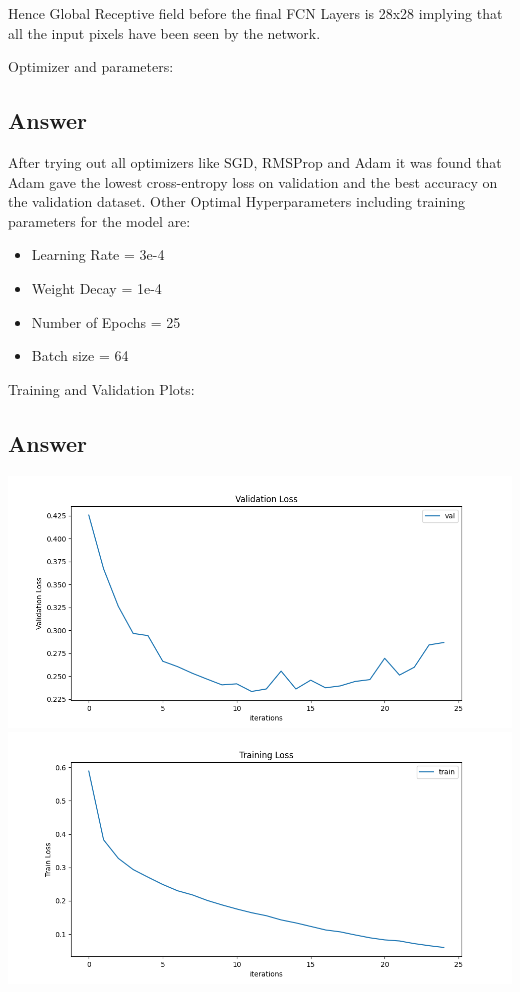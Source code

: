 \documentclass[
	12pt, %
]{fphw}
\begin{document}
Hence Global Receptive field before the final FCN Layers is 28x28 implying that all the input pixels have been seen by the network.

\begin{problem}
	Optimizer and parameters:
\end{problem}

\subsection*{Answer}

After trying out all optimizers like SGD, RMSProp and Adam it was found that Adam gave the lowest cross-entropy loss on validation and the best accuracy on the validation dataset.
Other Optimal Hyperparameters including training parameters for the model are:

\begin{itemize}
	\item Learning Rate =  3e-4  
	\item Weight Decay = 1e-4
	\item Number of Epochs = 25 
	\item Batch size = 64 
\end{itemize} 

\begin{problem}
	Training and Validation Plots:
\end{problem}

\subsection*{Answer}

\begin{center}
	\includegraphics[width=0.85\columnwidth]{valloss.png} 
	\includegraphics[width=0.85\columnwidth]{trainloss.png} 
\end{center}
\end{document}
